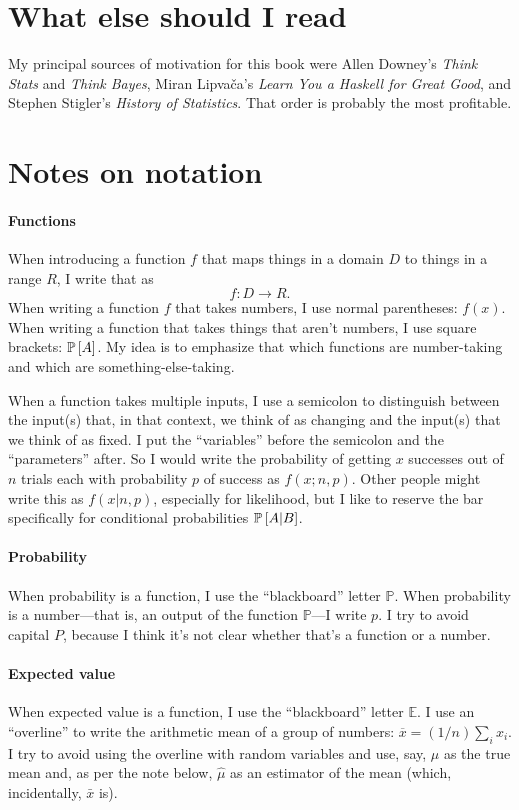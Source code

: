 \section*{What else should I read}

My principal sources of motivation for this book were Allen Downey's
\textit{Think Stats} and \textit{Think Bayes}, Miran Lipva\v{c}a's
\textit{Learn You a Haskell for Great Good}, and Stephen Stigler's
\textit{History of Statistics}. That order is probably the most profitable.

\section*{Notes on notation}

\paragraph{Functions} When introducing a function $f$ that maps things in a domain
$D$ to things in a range $R$, I write that as
$$
f : D \to R.
$$
When writing a function $f$ that takes numbers, I use normal parentheses:
$f(x)$. When writing a function that takes things that aren't numbers, I use
square brackets: $\mathbb{P}\left[{A}\right]$. My idea is to emphasize that which functions
are number-taking and which are something-else-taking.

When a function takes multiple inputs, I use a semicolon to distinguish
between the input(s) that, in that context, we think of as changing and the
input(s) that we think of as fixed. I put the ``variables'' before the
semicolon and the ``parameters'' after. So I would write the probability of
getting $x$ successes out of $n$ trials each with probability $p$ of success
as $f(x; n, p)$. Other people might write this as $f(x | n, p)$, especially
for likelihood, but I like to reserve the bar specifically for conditional
probabilities $\mathbb{P}\left[{A | B}\right]$.

\paragraph{Probability} When probability is a function, I use the
``blackboard'' letter $\mathbb{P}$. When probability is a number---that is, an
output of the function $\mathbb{P}$---I write $p$. I try to avoid capital
$P$, because I think it's not clear whether that's a function or a number.

\paragraph{Expected value} When expected value is a function, I use the
``blackboard'' letter $\mathbb{E}$. I use an ``overline'' to write the arithmetic
mean of a group of numbers: $\overline{x} = (1/n)\sum_i x_i$. I try to avoid
using the overline with random variables and use, say, $\mu$ as the true mean
and, as per the note below, $\hat{\mu}$ as an estimator of the mean (which,
incidentally, $\bar{x}$ is).

